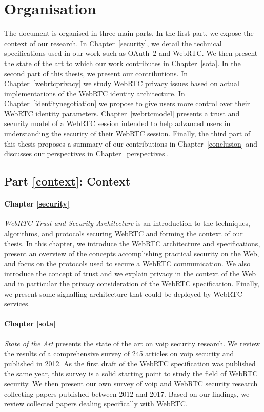 \section*{Organisation}
\label{introduction.organisation}
The document is organised in three main parts.
In the first part, we expose the context of our research.
In Chapter~\ref{security}, we detail the technical specifications used in our work such as OAuth~2 and WebRTC.
We then present the state of the art to which our work contributes in Chapter~\ref{sota}.
In the second part of this thesis, we present our contributions.
In Chapter~\ref{webrtcprivacy} we study WebRTC privacy issues based on actual implementations of the WebRTC identity architecture.
In Chapter~\ref{identitynegotiation} we propose to give users more control over their WebRTC identity parameters.
Chapter~\ref{webrtcmodel} presents a trust and security model of a WebRTC session intended to help advanced users in understanding the security of their WebRTC session.
Finally, the third part of this thesis proposes a summary of our contributions in Chapter~\ref{conclusion} and discusses our perspectives in Chapter~\ref{perspectives}.

\subsection*{Part \ref{context}:  Context}
\paragraph{Chapter \ref{security}} \textit{WebRTC Trust and Security Architecture} is an introduction to the techniques, algorithms, and protocols securing WebRTC and forming the context of our thesis.
In this chapter, we introduce the WebRTC architecture and specifications, present an overview of the concepts accomplishing practical security on the Web, and focus on the protocols used to secure a WebRTC communication.
We also introduce the concept of trust and we explain privacy in the context of the Web and in particular the privacy consideration of the WebRTC specification.
Finally, we present some signalling architecture that could be deployed by WebRTC services.

\paragraph{Chapter \ref{sota}} \textit{State of the Art} presents the state of the art on \gls{voip} security research.
We review the results of a comprehensive survey of 245 articles on \gls{voip} security and published in 2012.
As the first draft of the WebRTC specification was published the same year, this survey is a solid starting point to study the field of WebRTC security.
We then present our own survey of \gls{voip} and WebRTC security research collecting papers published between 2012 and 2017.
Based on our findings, we review collected papers dealing specifically with WebRTC.


